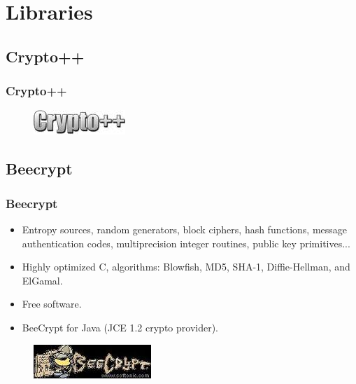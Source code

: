 \documentclass{beamer}
\begin{document}
\section{Libraries}

\subsection{Crypto++}

\begin{frame}
\frametitle{Crypto++}
\begin{figure}
\includegraphics[width=0.2\linewidth]{crypto.jpg}
\end{figure}
\end{frame}


\subsection{Beecrypt}
\begin{frame}
\frametitle{Beecrypt}
\begin{itemize}
\item Entropy sources, random generators, block ciphers, hash functions, message authentication codes, multiprecision integer routines, public key primitives...
\item Highly optimized C, algorithms: Blowfish, MD5, SHA-1, Diffie-Hellman, and ElGamal.
\item Free software.
\item BeeCrypt for Java (JCE 1.2 crypto provider).
\end{itemize}
\begin{figure}
\includegraphics[width=0.3\linewidth]{beecrypt.jpg}
\end{figure}
\end{frame}
\end{document}
